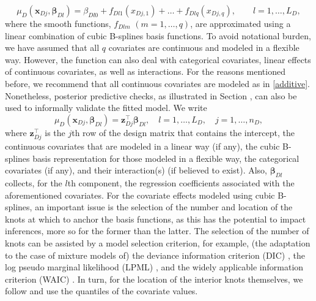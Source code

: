 \begin{equation}\label{additive}
\mu_{D}(\mathbf{x}_{Dj},\boldsymbol{\beta}_{Dl})=\beta_{Dl0}+f_{Dl1}(x_{Dj,1})+\ldots+f_{Dlq}(x_{Dj,q}),\qquad l=1,\ldots, L_D,
\end{equation}
where the smooth functions, $f_{Dlm}$ $(m = 1, \ldots, q)$, are approximated using a linear combination of cubic B-splines basis functions. To avoid notational burden, we have assumed that all $q$ covariates are continuous and modeled in a flexible way. However, the function  can also deal with categorical covariates, linear effects of continuous covariates, as well as interactions. For the reasons mentioned before, we recommend that all continuous covariates are modeled as in \eqref{additive}. Nonetheless, posterior predictive checks, as illustrated in Section , can also be used to informally validate the fitted model. We write 
\begin{equation}\label{mu_ddp}
\mu_{D}(\mathbf{x}_{Dj},\boldsymbol{\beta}_{Dl})=\mathbf{z}_{Dj}^{\top}\boldsymbol{\beta}_{Dl}, \quad l=1,\ldots,L_D,\quad j =1,\ldots,n_D,
\end{equation}
where $\mathbf{z}_{Dj}^{\top}$ is the $j$th row of the design matrix that contains the intercept, the continuous covariates that are modeled in a linear way (if any), the cubic B-splines basis representation for those modeled in a flexible way, the categorical covariates (if any), and their interaction(s) (if believed to exist). Also, $\boldsymbol{\beta}_{Dl}$ collects, for the $l$th component, the regression coefficients associated with the aforementioned covariates. For the covariate effects modeled using cubic B-splines, an important issue is the selection of the number and location of the knots at which to anchor the basis functions, as this has the potential to impact inferences, more so for the former than the latter. The selection of the number of knots can be assisted by a model selection criterion, for example, (the adaptation to the case of mixture models of) the deviance information criterion (DIC) \citep{Celeux2006}, the log pseudo marginal likelihood (LPML) \citep{Geisser1979}, and the widely applicable information criterion (WAIC) \citep{Gelman2014}. In turn, for the location of the interior knots themselves, we follow \cite{Rosenberg1995} and use the quantiles of the covariate values.  

